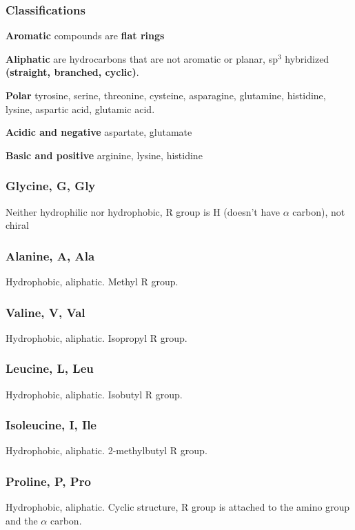 \documentclass[letterpaper, 12pt]{article}
\begin{document}
\subsubsection*{Classifications}

\textbf{Aromatic} compounds are \textbf{flat rings}

\textbf{Aliphatic} are hydrocarbons that are not aromatic or planar, sp$^3$ hybridized \textbf{(straight, branched, cyclic)}.

\textbf{Polar} tyrosine, serine, threonine, cysteine, asparagine, glutamine, histidine, lysine, aspartic acid, glutamic acid.

\textbf{Acidic and negative} aspartate, glutamate

\textbf{Basic and positive} arginine, lysine, histidine

\subsubsection*{Glycine, G, Gly}
Neither hydrophilic nor hydrophobic, R group is H (doesn't have $\alpha$ carbon), not chiral

\subsubsection*{Alanine, A, Ala}
Hydrophobic, aliphatic. Methyl R group.

\subsubsection*{Valine, V, Val}
Hydrophobic, aliphatic. Isopropyl R group.

\subsubsection*{Leucine, L, Leu}
Hydrophobic, aliphatic. Isobutyl R group.

\subsubsection*{Isoleucine, I, Ile}
Hydrophobic, aliphatic. 2-methylbutyl R group.

\subsubsection*{Proline, P, Pro}
Hydrophobic, aliphatic. Cyclic structure, R group is attached to the amino group and the $\alpha$ carbon.
\end{document}
